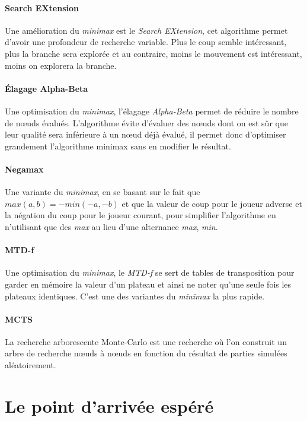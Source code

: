 \documentclass[a4paper]{article}
\begin{document}
		\paragraph{Search EXtension} Une amélioration du \emph{minimax} est le \emph{Search EXtension},
		cet algorithme permet d'avoir une profondeur de recherche variable. Plus le coup semble intéressant, plus
		la branche sera explorée et au contraire, moins le mouvement est intéressant, moins on explorera la branche.

		\paragraph{\'Elagage Alpha-Beta} Une optimisation du \emph{minimax}, l'élagage \emph{Alpha-Beta}
		permet de réduire le nombre de n\oe{}uds évalués. L'algorithme évite d'évaluer des n\oe{}uds dont
		on est sûr que leur qualité sera inférieure à un n\oe{}ud déjà évalué, il permet donc d'optimiser
		grandement l'algorithme minimax sans en modifier le résultat.

		\paragraph{Negamax} Une variante du \emph{minimax}, en se basant sur le fait
		que $max(a,b) = -min(-a,-b)$ et que la valeur de coup pour le joueur adverse et la négation du
		coup pour le joueur courant, pour simplifier l'algorithme en n'utilisant que des \emph{max}
		au lieu d'une alternance \emph{max}, \emph{min}.

		\paragraph{MTD-f} Une optimisation du \emph{minimax}, le \emph{MTD-f} se sert de tables de transposition
		pour garder en mémoire la valeur d'un plateau et ainsi ne noter qu'une seule fois les plateaux identiques.
		C'est une des variantes du \emph{minimax} la plus rapide.

		\paragraph{MCTS} La recherche arborescente Monte-Carlo est une recherche où l'on construit un arbre de recherche
		n\oe{}uds à n\oe{}uds en fonction du résultat de parties simulées aléatoirement.

\section{Le point d'arrivée espéré}
\end{document}
